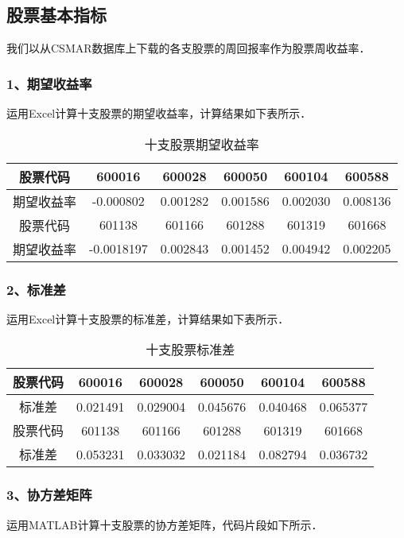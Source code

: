 
\subsection{股票基本指标}
我们以从CSMAR数据库上下载的各支股票的周回报率作为股票周收益率．

\subsubsection{1、期望收益率}
运用Excel计算十支股票的期望收益率，计算结果如下表所示．

\begin{table}[ht]
\centering
\caption{十支股票期望收益率}\label{inv8_tab1}
\begin{tabular}{|c|c|c|c|c|c|}
\hline
股票代码 &600016 & 600028 & 600050 & 600104 &	600588 \\
\hline
期望收益率 &-0.000802&0.001282&0.001586	&0.002030&0.008136\\
\hline
股票代码 &601138&601166&601288&601319&601668\\
\hline
期望收益率&-0.0018197&0.002843&0.001452&0.004942	&0.002205\\
\hline
\end{tabular}
\end{table}

\subsubsection{2、标准差}
运用Excel计算十支股票的标准差，计算结果如下表所示．

\begin{table}[ht]
\centering
\caption{十支股票标准差}\label{inv8_tab2}
\begin{tabular}{|c|c|c|c|c|c|}
\hline
股票代码 &600016 & 600028 & 600050 & 600104 &	600588 \\
\hline
标准差 &0.021491&0.029004&0.045676&0.040468&0.065377\\
\hline
股票代码 &601138&601166&601288&601319&601668\\
\hline
标准差&0.053231&0.033032&0.021184&0.082794&0.036732\\
\hline
\end{tabular}
\end{table}
\subsubsection{3、协方差矩阵}
运用MATLAB计算十支股票的协方差矩阵，代码片段如下所示．

